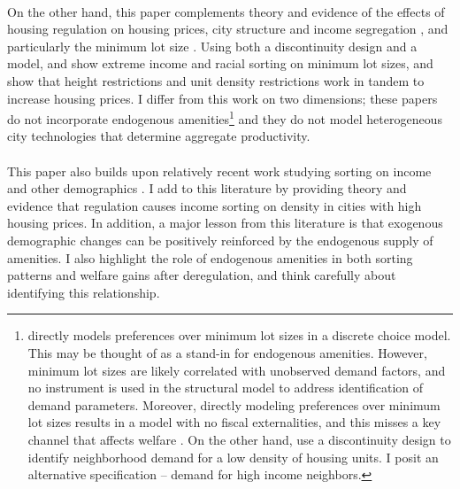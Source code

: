 \documentclass[12pt]{article}
\begin{document}
	\paragraph*{}
	On the other hand, this paper complements theory and evidence of the effects of housing regulation on housing prices, city structure and income segregation \citep{MolloyRSUE, gyourkomolloy, turner2014, glaesergyourko2018, bruecknersingh, anagoletal2021, bbheight, mills2005, HILBER2013, op2014}, and particularly the minimum lot size \citep{zabel, Song, kulka, Cui, molloynathansonpaciorek, KSC, griesonwhite, WHITE1975}. Using both a discontinuity design and a model, \cite{Song} and \cite{kulka} show extreme income and racial sorting on minimum lot sizes, and \cite{KSC} show that height restrictions and unit density restrictions work in tandem to increase housing prices. I differ from this work on two dimensions; these papers do not incorporate endogenous amenities\footnote{\cite{Song} directly models preferences over minimum lot sizes in a discrete choice model. This may be thought of as a stand-in for endogenous amenities. However, minimum lot sizes are likely correlated with unobserved demand factors, and no instrument is used in the structural model to address identification of demand parameters. Moreover, directly modeling preferences over minimum lot sizes results in a model with no fiscal externalities, and this misses a key channel that affects welfare \citep{hamilton1976, calabresetal}. On the other hand, \cite{KSC} use a discontinuity design to identify neighborhood demand for a low density of housing units. I posit an alternative specification -- demand for high income neighbors.} and they do not model heterogeneous city technologies that determine aggregate productivity.
	
	\paragraph*{}
	This paper also builds upon relatively recent work studying sorting on income and other demographics \citep{diamond2016, bshartley2020, couturehandbury, Coutureetal, superstarcities, su2021, citysizewagegap, Gentrificationcycles, FogliGuerrieri, ccpoortransport, parispoor, LeeandLin}. I add to this literature by providing theory and evidence that regulation causes income sorting on density in cities with high housing prices. In addition, a major lesson from this literature is that exogenous demographic changes can be positively reinforced by the endogenous supply of amenities. I also highlight the role of endogenous amenities in both sorting patterns and welfare gains after deregulation, and think carefully about identifying this relationship.
	
\end{document}
